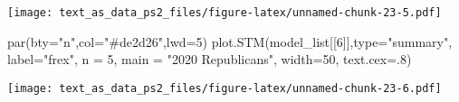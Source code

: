 \documentclass[
]{article}
\newenvironment{Shaded}{\begin{snugshade}}{\end{snugshade}}
\newcommand{\AttributeTok}[1]{\textcolor[rgb]{0.77,0.63,0.00}{#1}}
\newcommand{\DecValTok}[1]{\textcolor[rgb]{0.00,0.00,0.81}{#1}}
\newcommand{\FunctionTok}[1]{\textcolor[rgb]{0.00,0.00,0.00}{#1}}
\newcommand{\NormalTok}[1]{#1}
\newcommand{\StringTok}[1]{\textcolor[rgb]{0.31,0.60,0.02}{#1}}
\begin{document}
\texttt{[image: text\_as\_data\_ps2\_files/figure-latex/unnamed-chunk-23-5.pdf]}

\begin{Shaded}
\begin{Highlighting}[]
\FunctionTok{par}\NormalTok{(}\AttributeTok{bty=}\StringTok{"n"}\NormalTok{,}\AttributeTok{col=}\StringTok{"\#de2d26"}\NormalTok{,}\AttributeTok{lwd=}\DecValTok{5}\NormalTok{)}
\FunctionTok{plot.STM}\NormalTok{(model\_list[[}\DecValTok{6}\NormalTok{]],}\AttributeTok{type=}\StringTok{"summary"}\NormalTok{, }\AttributeTok{label=}\StringTok{"frex"}\NormalTok{, }\AttributeTok{n =} \DecValTok{5}\NormalTok{, }\AttributeTok{main =} \StringTok{"2020 Republicans"}\NormalTok{, }
         \AttributeTok{width=}\DecValTok{50}\NormalTok{, }\AttributeTok{text.cex=}\NormalTok{.}\DecValTok{8}\NormalTok{)}
\end{Highlighting}
\end{Shaded}

\texttt{[image: text\_as\_data\_ps2\_files/figure-latex/unnamed-chunk-23-6.pdf]}
\end{document}
